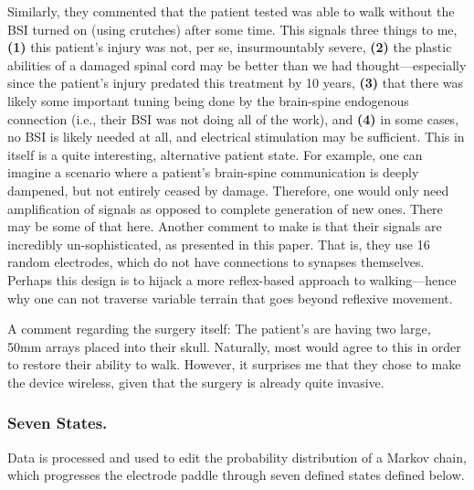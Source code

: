 \documentclass[12pt]{report}
\begin{document}
Similarly, they commented that the patient tested was able to walk without the BSI turned on (using crutches) after some time. This signals three things to me, \textbf{(1)} this patient's injury was not, per se, insurmountably severe, \textbf{(2)} the plastic abilities of a damaged spinal cord may be better than we had thought---especially since the patient's injury predated this treatment by 10 years, \textbf{(3)} that there was likely some important tuning being done by the brain-spine endogenous connection (i.e., their BSI was not doing all of the work), and \textbf{(4)} in some cases, no BSI is likely needed at all, and electrical stimulation may be sufficient. This in itself is a quite interesting, alternative patient state. For example, one can imagine a scenario where a patient's brain-spine communication is deeply dampened, but not entirely ceased by damage. Therefore, one would only need amplification of signals as opposed to complete generation of new ones. There may be some of that here. Another comment to make is that their signals are incredibly un-sophisticated, as presented in this paper. That is, they use 16 random electrodes, which do not have connections to synapses themselves. Perhaps this design is to hijack a more reflex-based approach to walking---hence why one can not traverse variable terrain that goes beyond reflexive movement.\newline

A comment regarding the surgery itself: The patient's are having two large, 50mm arrays placed into their skull. Naturally, most would agree to this in order to restore their ability to walk. However, it surprises me that they chose to make the device wireless, given that the surgery is already quite invasive. 

\subsubsection{Seven States.} 

Data is processed and used to edit the probability distribution of a Markov chain, which progresses the electrode paddle through seven defined states defined below.
\end{document}
